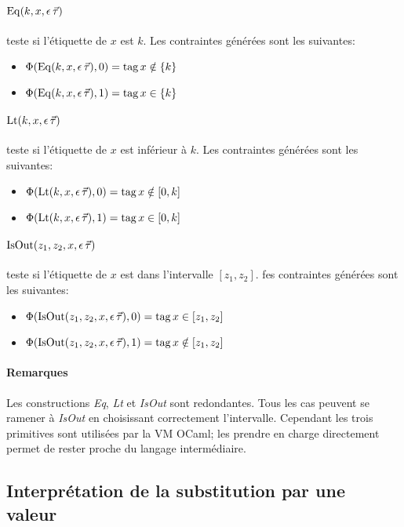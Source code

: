 \paragraph{$\operatorname{Eq}(k,x,{\epsilon \, \vec{\tau}})$} teste si l'étiquette de $x$ est $k$.
Les contraintes générées sont les suivantes: 
\begin{itemize}
  \item $\Phi(\operatorname{Eq}(k,x,{\epsilon \, \vec{\tau}}),0) = \operatorname{tag} x \notin \{k\}$
  \item $\Phi(\operatorname{Eq}(k,x,{\epsilon \, \vec{\tau}}),1) = \operatorname{tag} x \in \{k\}$
\end{itemize}

\paragraph{$\operatorname{Lt}(k,x,{\epsilon \, \vec{\tau}})$} teste si l'étiquette de $x$ est inférieur à
$k$.
Les contraintes générées sont les suivantes: 
\begin{itemize}
  \item $\Phi(\operatorname{Lt}(k,x,{\epsilon \, \vec{\tau}}),0) = \operatorname{tag} x \notin [0,k]$
  \item $\Phi(\operatorname{Lt}(k,x,{\epsilon \, \vec{\tau}}),1) = \operatorname{tag} x \in [0,k]$
\end{itemize}

\paragraph{$\operatorname{IsOut}(z_1,z_2,x,{\epsilon \, \vec{\tau}})$} teste si l'étiquette de $x$ est
dans l'intervalle $[z_1,z_2]$.
fes contraintes générées sont les suivantes: 
\begin{itemize}
  \item $\Phi(\operatorname{IsOut}(z_1,z_2,x,{\epsilon \, \vec{\tau}}),0) = \operatorname{tag} x \in [z_1,z_2]$
  \item $\Phi(\operatorname{IsOut}(z_1,z_2,x,{\epsilon \, \vec{\tau}}),1) = \operatorname{tag} x \notin [z_1,z_2]$
\end{itemize}

\paragraph{Remarques} Les constructions \emph{Eq}, \emph{Lt} et \emph{IsOut}
sont redondantes. Tous les cas peuvent se ramener à \emph{IsOut} en choisissant
correctement l'intervalle. Cependant les trois primitives sont utilisées par la
VM OCaml; les prendre en charge directement permet de rester proche du langage
intermédiaire.

\subsection{Interprétation de la substitution par une valeur}
\newcommand\subst{\{\var \leftarrow v\}}

